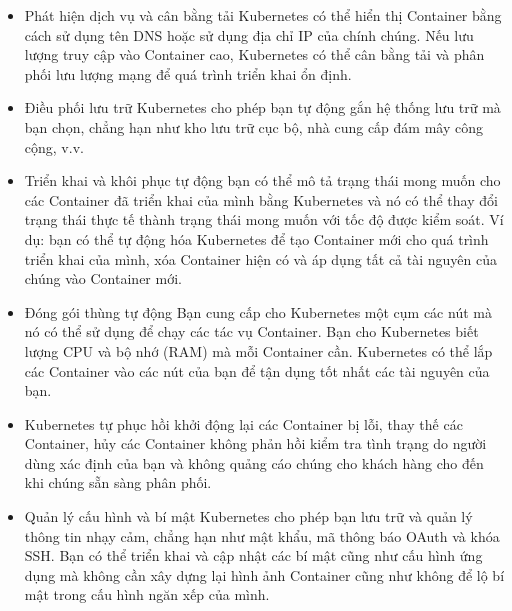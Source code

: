 \documentclass[12pt,a4paper]{report}
\begin{document}
	\hspace{0.3cm}{Container là một cách hay để đóng gói và chạy các ứng dụng của bạn. Trong môi trường sản xuất, bạn cần quản lý các Container chạy ứng dụng và đảm bảo rằng không có thời gian chết. Ví dụ: nếu một Container gặp sự cố, thì một Container khác cần phải khởi động. Sẽ không dễ dàng hơn nếu hành vi này được xử lý bởi một hệ thống?\\}
	
	\hspace{0.3cm}{Đó là cách Kubernetes hoạt động! Kubernetes cung cấp cho bạn một khung để chạy các hệ thống phân tán một cách linh hoạt. Nó đảm nhiệm việc mở rộng quy mô và chuyển đổi dự phòng cho ứng dụng của bạn, cung cấp các mẫu triển khai, v.v. Ví dụ: Kubernetes có thể dễ dàng quản lý triển khai canary cho hệ thống của bạn.\\}
	
	\hspace{0.3cm}{Kubenertes cung cấp cho bạn:}
	\begin{itemize}
		\item Phát hiện dịch vụ và cân bằng tải Kubernetes có thể hiển thị Container bằng cách sử dụng tên DNS hoặc sử dụng địa chỉ IP của chính chúng. Nếu lưu lượng truy cập vào Container cao, Kubernetes có thể cân bằng tải và phân phối lưu lượng mạng để quá trình triển khai ổn định.
		\item Điều phối lưu trữ Kubernetes cho phép bạn tự động gắn hệ thống lưu trữ mà bạn chọn, chẳng hạn như kho lưu trữ cục bộ, nhà cung cấp đám mây công cộng, v.v.
		\item Triển khai và khôi phục tự động bạn có thể mô tả trạng thái mong muốn cho các Container đã triển khai của mình bằng Kubernetes và nó có thể thay đổi trạng thái thực tế thành trạng thái mong muốn với tốc độ được kiểm soát. Ví dụ: bạn có thể tự động hóa Kubernetes để tạo Container mới cho quá trình triển khai của mình, xóa Container hiện có và áp dụng tất cả tài nguyên của chúng vào Container mới.
		\item Đóng gói thùng tự động Bạn cung cấp cho Kubernetes một cụm các nút mà nó có thể sử dụng để chạy các tác vụ Container. Bạn cho Kubernetes biết lượng CPU và bộ nhớ (RAM) mà mỗi Container cần. Kubernetes có thể lắp các Container vào các nút của bạn để tận dụng tốt nhất các tài nguyên của bạn.
		\item Kubernetes tự phục hồi khởi động lại các Container bị lỗi, thay thế các Container, hủy các Container không phản hồi kiểm tra tình trạng do người dùng xác định của bạn và không quảng cáo chúng cho khách hàng cho đến khi chúng sẵn sàng phân phối.
		\item Quản lý cấu hình và bí mật Kubernetes cho phép bạn lưu trữ và quản lý thông tin nhạy cảm, chẳng hạn như mật khẩu, mã thông báo OAuth và khóa SSH. Bạn có thể triển khai và cập nhật các bí mật cũng như cấu hình ứng dụng mà không cần xây dựng lại hình ảnh Container cũng như không để lộ bí mật trong cấu hình ngăn xếp của mình.
	\end{itemize}
\end{document}
